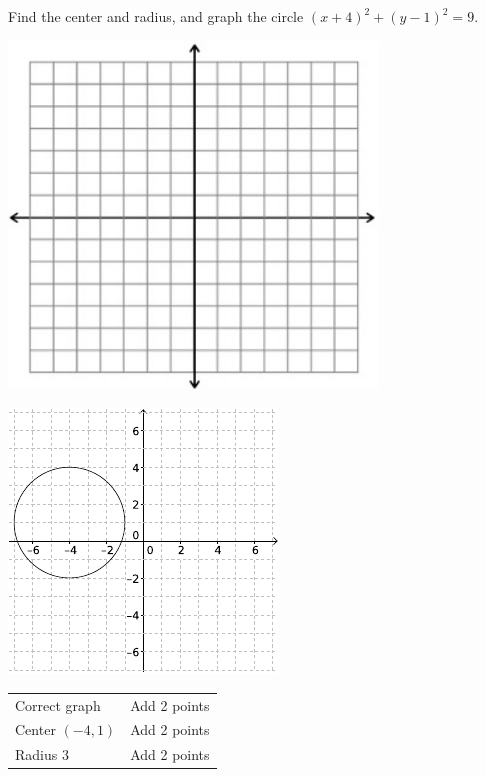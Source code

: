 {
	Find the center and radius, and graph the circle $(x+4)^2+(y-1)^2=9$.\begin{onlyproblem}\begin{center}\includegraphics{fig-graphpaper.png}\end{center}\end{onlyproblem} \begin{onlysolution}\begin{center}\includegraphics{fig100-20-a-answer}\end{center}\end{onlysolution}
}
{
	\begin{tabular}{l l}
	Correct graph & Add 2 points\\
	Center $(-4, 1)$ & Add 2 points \\
	Radius $3$ & Add 2 points
	\end{tabular}
}

